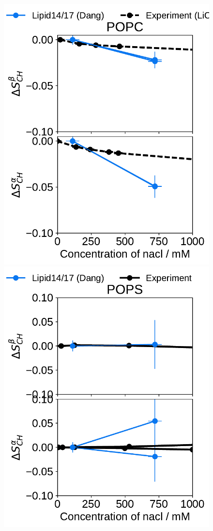  
\begin{figure}[htb!] 
  \centering 
  \includegraphics[width=\figwidth]{../img/ecc_pops/l17/order_parameters_changes_A-B_POPC_nacl.pdf} 
  \includegraphics[width=\figwidth]{../img/ecc_pops/l17/order_parameters_changes_A-B_POPS_nacl.pdf} 

\end{figure}
